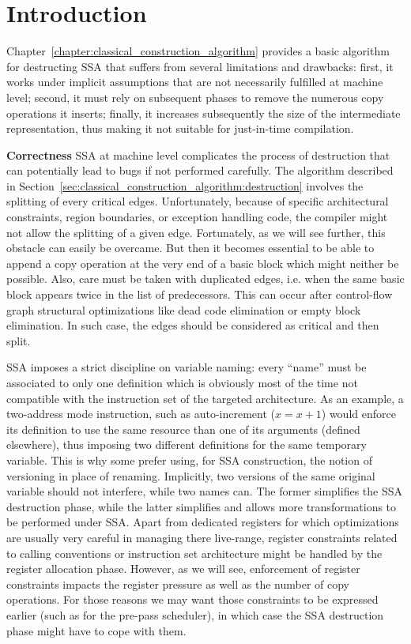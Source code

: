 \section{Introduction}
Chapter~\ref{chapter:classical_construction_algorithm} provides a basic algorithm for destructing SSA that suffers from several limitations and drawbacks: first, it works under implicit assumptions that are not necessarily fulfilled at machine level; second, it must rely on subsequent phases to remove the numerous copy operations it inserts; finally, it increases subsequently the size of the intermediate representation, thus making it not suitable for just-in-time compilation.   

{\bf Correctness}
SSA at machine level complicates the process of destruction that can potentially lead to bugs if not performed carefully. The algorithm described in Section~\ref{sec:classical_construction_algorithm:destruction} involves the splitting of every critical edges. Unfortunately, because of specific architectural constraints, region boundaries, or exception handling code, the compiler might not allow the splitting of a given edge. Fortunately, as we will see further, this obstacle can easily be overcame. But then it becomes essential to be able to append a copy operation at the very end of a basic block which might neither be possible. Also, care must be taken with duplicated edges, i.e. when the same basic block appears twice in the list of predecessors.
This can occur after control-flow graph structural optimizations like
dead code elimination or empty block elimination.
In such case, the edges should be considered as critical and then split.

SSA imposes a strict discipline on variable naming: every ``name'' must be associated to only one definition which is obviously most of the time not compatible with the instruction set of the targeted architecture. As an example, a two-address mode instruction, such as auto-increment ($x=x+1$) would enforce its definition to use the same resource than one of its arguments (defined elsewhere), thus imposing two different definitions for the same temporary variable. This is why some prefer using, for SSA construction, the notion of versioning in place of renaming. Implicitly, two versions of the same original variable should not interfere, while two names can. The former simplifies the SSA destruction phase, while the latter simplifies and allows more transformations to be performed under SSA. Apart from dedicated registers for which optimizations are usually very careful in managing there live-range, register constraints related to calling conventions or instruction set architecture might be handled by the register allocation phase. However, as we will see, enforcement of register constraints impacts the register pressure as well as the number of copy operations. For those reasons we may want those constraints to be expressed earlier (such as for the pre-pass scheduler), in which case the SSA destruction phase might have to cope with them.

